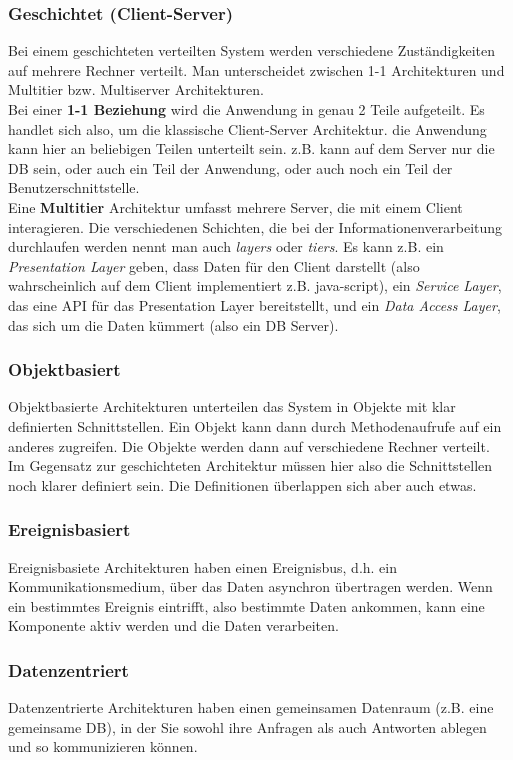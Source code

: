 \subsubsection{Geschichtet (Client-Server)}
Bei einem geschichteten verteilten System werden verschiedene Zuständigkeiten auf mehrere Rechner verteilt. Man unterscheidet zwischen 1-1 Architekturen und Multitier bzw. Multiserver Architekturen.\\
Bei einer \textbf{1-1 Beziehung} wird die Anwendung in genau 2 Teile aufgeteilt. Es handlet sich also, um die klassische Client-Server Architektur. die Anwendung kann hier an beliebigen Teilen unterteilt sein. z.B. kann auf dem Server nur die DB sein, oder auch ein Teil der Anwendung, oder auch noch ein Teil der Benutzerschnittstelle.\\
Eine \textbf{Multitier} Architektur umfasst mehrere Server, die mit einem Client interagieren. Die verschiedenen Schichten, die bei der Informationenverarbeitung durchlaufen werden nennt man auch \textit{layers} oder \textit{tiers}. Es kann z.B. ein \textit{Presentation Layer} geben, dass Daten für den Client darstellt (also wahrscheinlich auf dem Client implementiert z.B. java-script), ein \textit{Service Layer}, das eine API für das Presentation Layer bereitstellt, und ein \textit{Data Access Layer}, das sich um die Daten kümmert (also ein DB Server).

\subsubsection{Objektbasiert}
Objektbasierte Architekturen unterteilen das System in Objekte mit klar definierten Schnittstellen. Ein Objekt kann dann durch Methodenaufrufe auf ein anderes zugreifen. Die Objekte werden dann auf verschiedene Rechner verteilt.\\
Im Gegensatz zur geschichteten Architektur müssen hier also die Schnittstellen noch klarer definiert sein. Die Definitionen überlappen sich aber auch etwas.

\subsubsection{Ereignisbasiert}
Ereignisbasiete Architekturen haben einen Ereignisbus, d.h. ein Kommunikationsmedium, über das Daten asynchron übertragen werden. Wenn ein bestimmtes Ereignis eintrifft, also bestimmte Daten ankommen, kann eine Komponente aktiv werden und die Daten verarbeiten.

\subsubsection{Datenzentriert}
Datenzentrierte Architekturen haben einen gemeinsamen Datenraum (z.B. eine gemeinsame DB), in der Sie sowohl ihre Anfragen als auch Antworten ablegen und so kommunizieren können.